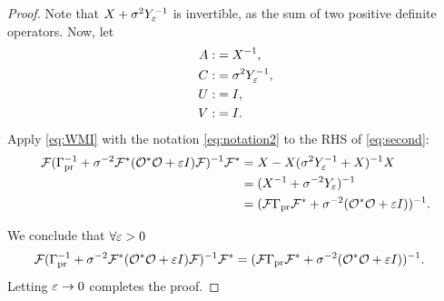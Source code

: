 \begin{proof}
   Note that $X + \sigma^2 Y_{\varepsilon}^{-1}$ is invertible, as the sum of
   two positive definite operators. Now, let
   \begin{align}\label{eq:notation2}
     \begin{split}
       A :&= X^{-1}, \\
       C :&= \sigma^2Y_{\eps}^{-1}, \\
       U :&= I, \\
       V :&= I.
     \end{split}
   \end{align}
   Apply \eqref{eq:WMI} with the notation \eqref{eq:notation2} to the
   RHS of \eqref{eq:second}:
  \begin{align*}
    \begin{split}
      \fwd( \prcov^{-1} + \sigma^{-2}  \fwd^* (\obs^* \obs +\eps I) \fwd )^{-1}\fwd^* &= X - X(\sigma^2Y_{\eps}^{-1} + X)^{-1}X \\
      &= (X^{-1} + \sigma^{-2}Y_{\eps})^{-1} \\
      &= (\fwd \prcov \fwd^* + \sigma^{-2} (\obs^*\obs + \eps I))^{-1}.
    \end{split}
  \end{align*}

  We conclude that $\forall \varepsilon > 0$
  \begin{align*}
    \begin{split}
      \fwd( \prcov^{-1} + \sigma^{-2}  \fwd^* (\obs^* \obs +\eps I) \fwd )^{-1}\fwd^* 
     &= (\fwd \prcov \fwd^* + \sigma^{-2} (\obs^*\obs + \eps I))^{-1}.
    \end{split}
  \end{align*}
  Letting $\varepsilon \to 0$ completes the proof.
\end{proof}


